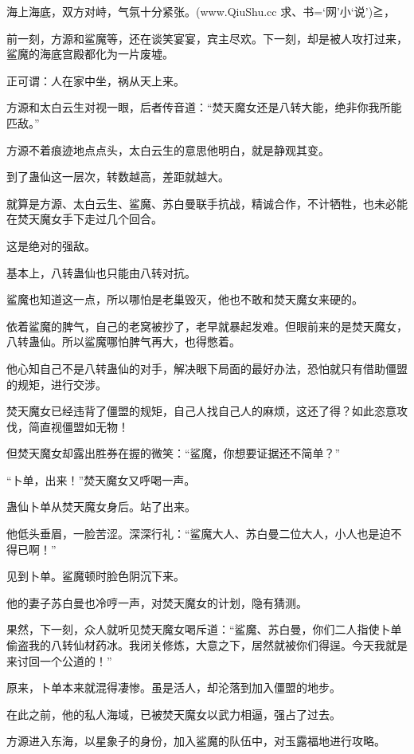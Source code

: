 
\begin{this_body}

海上海底，双方对峙，气氛十分紧张。(www.QiuShu.cc 求、书=‘网’小‘说’)≧，

前一刻，方源和鲨魔等，还在谈笑宴宴，宾主尽欢。下一刻，却是被人攻打过来，鲨魔的海底宫殿都化为一片废墟。

正可谓：人在家中坐，祸从天上来。

方源和太白云生对视一眼，后者传音道：“焚天魔女还是八转大能，绝非你我所能匹敌。”

方源不着痕迹地点点头，太白云生的意思他明白，就是静观其变。

到了蛊仙这一层次，转数越高，差距就越大。

就算是方源、太白云生、鲨魔、苏白曼联手抗战，精诚合作，不计牺牲，也未必能在焚天魔女手下走过几个回合。

这是绝对的强敌。

基本上，八转蛊仙也只能由八转对抗。

鲨魔也知道这一点，所以哪怕是老巢毁灭，他也不敢和焚天魔女来硬的。

依着鲨魔的脾气，自己的老窝被抄了，老早就暴起发难。但眼前来的是焚天魔女，八转蛊仙。所以鲨魔哪怕脾气再大，也得憋着。

他心知自己不是八转蛊仙的对手，解决眼下局面的最好办法，恐怕就只有借助僵盟的规矩，进行交涉。

焚天魔女已经违背了僵盟的规矩，自己人找自己人的麻烦，这还了得？如此恣意攻伐，简直视僵盟如无物！

但焚天魔女却露出胜券在握的微笑：“鲨魔，你想要证据还不简单？”

“卜单，出来！”焚天魔女又呼喝一声。

蛊仙卜单从焚天魔女身后。站了出来。

他低头垂眉，一脸苦涩。深深行礼：“鲨魔大人、苏白曼二位大人，小人也是迫不得已啊！”

见到卜单。鲨魔顿时脸色阴沉下来。

他的妻子苏白曼也冷哼一声，对焚天魔女的计划，隐有猜测。

果然，下一刻，众人就听见焚天魔女喝斥道：“鲨魔、苏白曼，你们二人指使卜单偷盗我的八转仙材药冰。我闭关修炼，大意之下，居然就被你们得逞。今天我就是来讨回一个公道的！”

原来，卜单本来就混得凄惨。虽是活人，却沦落到加入僵盟的地步。

在此之前，他的私人海域，已被焚天魔女以武力相逼，强占了过去。

方源进入东海，以星象子的身份，加入鲨魔的队伍中，对玉露福地进行攻略。


\end{this_body}

